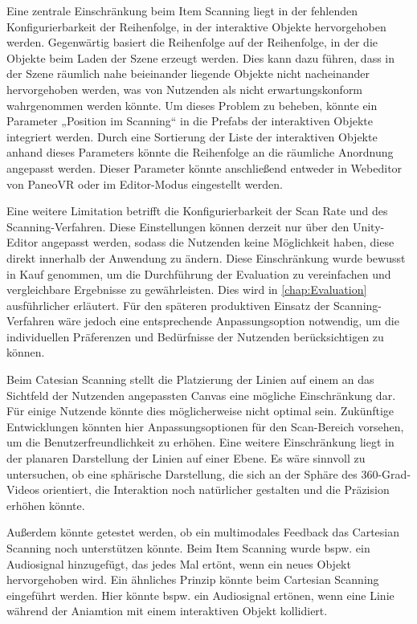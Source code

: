 Eine zentrale Einschränkung beim Item Scanning liegt in der fehlenden Konfigurierbarkeit der Reihenfolge, in der interaktive Objekte hervorgehoben werden. Gegenwärtig basiert die Reihenfolge auf der Reihenfolge, in der die Objekte beim Laden der Szene erzeugt werden. Dies kann dazu führen, dass in der Szene räumlich nahe beieinander liegende Objekte nicht nacheinander hervorgehoben werden, was von Nutzenden als nicht erwartungskonform wahrgenommen werden könnte. Um dieses Problem zu beheben, könnte ein Parameter „Position im Scanning“ in die Prefabs der interaktiven Objekte integriert werden. Durch eine Sortierung der Liste der interaktiven Objekte anhand dieses Parameters könnte die Reihenfolge an die räumliche Anordnung angepasst werden. Dieser Parameter könnte anschließend entweder in Webeditor von PaneoVR oder im Editor-Modus eingestellt werden. 

Eine weitere Limitation betrifft die Konfigurierbarkeit der Scan Rate und des Scanning-Verfahren. Diese Einstellungen können derzeit nur über den Unity-Editor angepasst werden, sodass die Nutzenden keine Möglichkeit haben, diese direkt innerhalb der Anwendung zu ändern. Diese Einschränkung wurde bewusst in Kauf genommen, um die Durchführung der Evaluation zu vereinfachen und vergleichbare Ergebnisse zu gewährleisten. Dies wird in \autoref{chap:Evaluation} ausführlicher erläutert. 
Für den späteren produktiven Einsatz der Scanning-Verfahren wäre jedoch eine entsprechende Anpassungsoption notwendig, um die individuellen Präferenzen und Bedürfnisse der Nutzenden berücksichtigen zu können.

Beim Catesian Scanning stellt die Platzierung der Linien auf einem an das Sichtfeld der Nutzenden angepassten Canvas eine mögliche Einschränkung dar. Für einige Nutzende könnte dies möglicherweise nicht optimal sein. Zukünftige Entwicklungen könnten hier Anpassungsoptionen für den Scan-Bereich vorsehen, um die Benutzerfreundlichkeit zu erhöhen. Eine weitere Einschränkung liegt in der planaren Darstellung der Linien auf einer Ebene. Es wäre sinnvoll zu untersuchen, ob eine sphärische Darstellung, die sich an der Sphäre des 360-Grad-Videos orientiert, die Interaktion noch natürlicher gestalten und die Präzision erhöhen könnte.

Außerdem könnte getestet werden, ob ein multimodales Feedback das Cartesian Scanning noch unterstützen könnte. Beim Item Scanning wurde bspw. ein Audiosignal hinzugefügt, das jedes Mal ertönt, wenn ein neues Objekt hervorgehoben wird. Ein ähnliches Prinzip könnte beim Cartesian Scanning eingeführt werden. Hier könnte bspw. ein Audiosignal ertönen, wenn eine Linie während der Aniamtion mit einem interaktiven Objekt kollidiert. 

